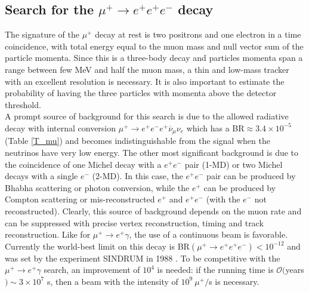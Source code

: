 \documentclass[12pt,a4paper,openright, oneside, titlepage]{book} %
\begin{document}
\subsection{Search for the $\mu^+ \rightarrow e^+ e^+e^-$ decay}
The signature of the $\mu^+$ decay at rest is two positrons and one electron in a time coincidence, with total energy equal to the muon mass and null vector sum of the particle momenta.
Since this is a three-body decay and particles momenta span a range between few MeV and half the muon mass, a thin and low-mass tracker with an excellent resolution is necessary.
It is also important to estimate the probability of having the three particles with momenta above the detector threshold.\\
A prompt source of background for this search is due to the allowed radiative decay with internal conversion $\mu^+\rightarrow e^+e^-e^+\overline{\nu}_{\mu}\nu_e$ which has a BR$\approx 3.4\times 10^{-5}$ (Table \ref{T_mu}) and becomes indistinguishable from the signal when the neutrinos have very low energy. 
The other most significant background is due to the coincidence of one Michel decay with a $e^+e^-$ pair (1-MD) or two Michel decays with a single $e^-$ (2-MD). 
In this case, the $e^+e^-$ pair can be produced by Bhabha scattering or photon conversion, while the $e^+$ can be produced by Compton scattering or mis-reconstructed $e^+$ and $e^+e^-$ (with the $e^-$ not reconstructed). 
Clearly, this source of background depends on the muon rate and can be suppressed with precise vertex reconstruction, timing and track reconstruction.
Like for $\mu^+ \rightarrow e^+ \gamma$, the use of a continuous beam is favorable.\\
Currently the world-best limit on this decay is BR$(\mu^+ \rightarrow e^+ e^+e^-)<10^{-12}$ and was set by the experiment SINDRUM in 1988 \cite{SINDRUM}.
To be competitive with the $\mu^+\rightarrow e^+\gamma$ search, an improvement of $10^4$ is needed: if the running time is $\mathcal{O}($years$)\sim 3\times 10^7$ s, then a beam with the intensity of $10^9\ \mu^+/$s is necessary.
\end{document}
